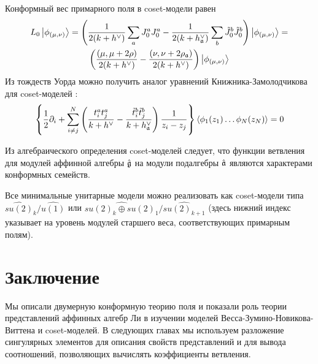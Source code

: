 Конформный вес примарного поля в coset-модели равен
\begin{multline}
  L_0\left|\phi_{(\mu,\nu)}\right>=\left(\frac{1}{2(k+h^{\vee})}\sum_aJ^a_0J^a_0-\frac{1}{2(k+h_{\mathfrak{a}}^{\vee})}\sum_b \tilde{J}^b_0 \tilde{J}^b_0 \right)
  \left|\phi_{(\mu,\nu)}\right>=\\
  \left(\frac{(\mu,\mu+2\rho)}{2(k+h^{\vee})}-\frac{(\nu,\nu+2\rho_{\mathfrak{a}})}{2(k+h^{\vee})}\right)\left|\phi_{(\mu,\nu)}\right>
\end{multline}
Из тождеств Уорда можно получить аналог уравнений Книжника-Замолодчикова для coset-моделей \cite{kogan1997knizhnik}:
\begin{equation}
  \left\{\frac{1}{2}\partial_{i} + \sum_{i\neq j}^{N}\left(\frac{t^{a}_{i}t^{a}_{j}}{k+h^{\vee}}-\frac{\tilde t^{b}_{i}\tilde t^{b}_{j}}{k+h^{\vee}_{\mathfrak{a}}}\right)\frac{1}{z_{i}-z_{j}}\right\} \left<\phi_{1}(z_{1})\dots \phi_{N}(z_{N})\right>=0
  \label{eq:101}
\end{equation}

Из алгебраического определения coset-моделей следует, что функции ветвления для модулей аффинной алгебры $\hat{\mathfrak{g}}$ на модули подалгебры $\hat{\mathfrak{a}}$ являются характерами конформных семейств. 

Все минимальные унитарные модели можно реализовать как coset-модели типа $\widehat{su(2)}_k/\widehat{u(1)}$ или $\widehat{su(2)_k\oplus su(2)_1}/\widehat{su(2)_{k+1}}$ (здесь нижний индекс указывает на уровень модулей старшего веса, соответствующих примарным полям). 

\section{Заключение}
\label{sec:review-conclusion}

Мы описали двумерную конформную теорию поля и показали роль теории представлений аффинных алгебр Ли в изучении моделей Весса-Зумино-Новикова-Виттена и coset-моделей. В следующих главах мы используем разложение сингулярных элементов для описания свойств представлений и для вывода соотношений, позволяющих вычислять коэффициенты ветвления.
